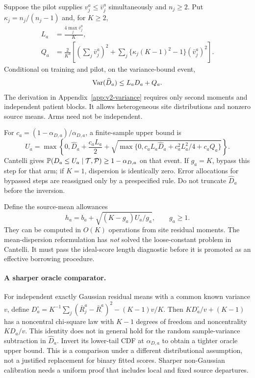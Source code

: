 Suppose the pilot supplies $v_j^a\le\bar v_j^a$ simultaneously and
$n_j\ge2$. Put $\kappa_j=n_j/(n_j-1)$ and, for $K\ge2$,
\begin{align}
 L_a&=\frac{4\max_j\bar v_j^a}{K},\\
 Q_a&=\frac{2}{K^4}\left[
  \left(\sum_j\bar v_j^a\right)^2+
  \sum_j\{\kappa_j(K-1)^2-1\}(\bar v_j^a)^2\right].
 \label{eq:v2-var-constants}
\end{align}
Conditional on training and pilot, on the variance-bound event,
\begin{equation}
 \operatorname{Var}(\widehat D_a)\le L_aD_a+Q_a.\label{eq:v2-var-bound}
\end{equation}
The derivation in Appendix~\ref{app:v2-variance} requires only second moments
and independent patient blocks. It allows heterogeneous site distributions
and nonzero source means. Arms need not be independent.

For $c_a=(1-\alpha_{D,a})/\alpha_{D,a}$, a finite-sample upper bound is
\begin{equation}
 U_a=\max\left\{0,\widehat D_a+\frac{c_aL_a}{2}
 +\sqrt{\max\{0,c_aL_a\widehat D_a+c_a^2L_a^2/4+c_aQ_a\}}\right\}.
 \label{eq:v2-dispersion-upper}
\end{equation}
Cantelli gives $\mathbb P(D_a\le U_a\mid\mathcal T,\mathcal P)\ge1-\alpha_{D,a}$
on that event. If $g_a=K$, bypass this step for that arm; if $K=1$,
dispersion is identically zero. Error allocations for bypassed steps are
reassigned only by a prespecified rule. Do not truncate $\widehat D_a$
before the inversion.

Define the source-mean allowances
\[
 h_a=b_a+\sqrt{(K-g_a)U_a/g_a},\qquad g_a\ge1.
\]
They can be computed in $O(K)$ operations from site residual moments.
The mean-dispersion reformulation has \emph{not} solved the loose-constant
problem in Cantelli. It must pass the ideal-score length diagnostic before
it is promoted as an effective borrowing procedure.

\paragraph{A sharper oracle comparator.}
For independent exactly Gaussian residual means with a common known variance
$v$, define $D_a^\circ=K^{-1}\sum_j(\bar R_j^a-\bar R_\cdot^a)^2-(K-1)v/K$.
Then $KD_a^\circ/v+(K-1)$ has a noncentral chi-square law with $K-1$
degrees of freedom and noncentrality $KD_a/v$. This identity does not in general
hold for the random sample-variance subtraction in $\widehat D_a$. Invert its lower-tail CDF
at $\alpha_{D,a}$ to obtain a tighter oracle upper bound. This is a
comparison under a different distributional assumption, not a justified
replacement for binary fitted scores. Sharper non-Gaussian calibration needs
a uniform proof that includes local and fixed source departures.

